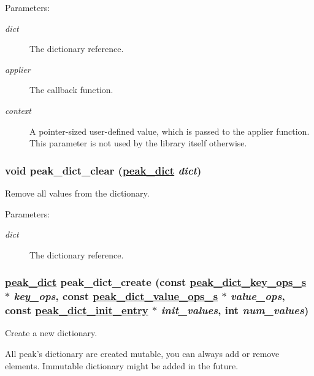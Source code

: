\begin{Desc}
\item[Parameters:]
\begin{description}
\item[{\em dict}]The dictionary reference. \item[{\em applier}]The callback function. \item[{\em context}]A pointer-sized user-defined value, which is passed to the applier function. This parameter is not used by the library itself otherwise. \end{description}
\end{Desc}
\hypertarget{group__dict_ga31}{
\subsubsection[peak\_\-dict\_\-clear]{\setlength{\rightskip}{0pt plus 5cm}void peak\_\-dict\_\-clear (\hyperlink{group__dict_ga0}{peak\_\-dict} {\em dict})}}
\label{group__dict_ga31}


Remove all values from the dictionary. 

\begin{Desc}
\item[Parameters:]
\begin{description}
\item[{\em dict}]The dictionary reference. \end{description}
\end{Desc}
\hypertarget{group__dict_ga22}{
\subsubsection[peak\_\-dict\_\-create]{\setlength{\rightskip}{0pt plus 5cm}\hyperlink{group__dict_ga0}{peak\_\-dict} peak\_\-dict\_\-create (const \hyperlink{structpeak__dict__key__ops__s}{peak\_\-dict\_\-key\_\-ops\_\-s} $\ast$ {\em key\_\-ops}, const \hyperlink{structpeak__dict__value__ops__s}{peak\_\-dict\_\-value\_\-ops\_\-s} $\ast$ {\em value\_\-ops}, const \hyperlink{structpeak__dict__init__entry}{peak\_\-dict\_\-init\_\-entry} $\ast$ {\em init\_\-values}, int {\em num\_\-values})}}
\label{group__dict_ga22}


Create a new dictionary. 

All peak's dictionary are created mutable, you can always add or remove elements. Immutable dictionary might be added in the future.

